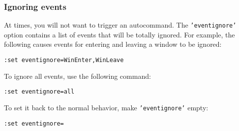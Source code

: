 \subsubsection{Ignoring events}
At times, you will not want to trigger an autocommand.
The \texttt{'eventignore'} option contains a list of events that will be totally ignored.
For example, the following causes events for entering and leaving a window to be ignored:

\begin{Verbatim}[samepage=true]
 :set eventignore=WinEnter,WinLeave
\end{Verbatim}

To ignore all events, use the following command:

\begin{Verbatim}[samepage=true]
 :set eventignore=all
\end{Verbatim}

To set it back to the normal behavior, make \texttt{'eventignore'} empty:

\begin{Verbatim}[samepage=true]
 :set eventignore=
\end{Verbatim}

\clearpage
